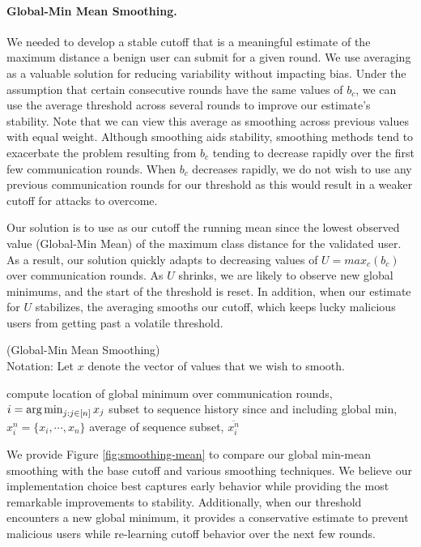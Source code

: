 \documentclass{article} %
\begin{document}
%
\paragraph{Global-Min Mean Smoothing. } We needed to develop a stable cutoff that is a meaningful estimate of the maximum distance a benign user can submit for a given round. We use averaging as a valuable solution for reducing variability without impacting bias. Under the assumption that certain consecutive rounds have the same values of $b_c$, we can use the average threshold across several rounds to improve our estimate's stability. Note that we can view this average as smoothing across previous values with equal weight. Although smoothing aids stability, smoothing methods tend to exacerbate the problem resulting from $b_c$ tending to decrease rapidly over the first few communication rounds. When $b_c$ decreases rapidly, we do not wish to use any previous communication rounds for our threshold as this would result in a weaker cutoff for attacks to overcome. 

Our solution is to use as our cutoff the running mean since the lowest observed value (Global-Min Mean) of the maximum class distance for the validated user. As a result, our solution quickly adapts to decreasing values of $U = max_c (b_c)$ over communication rounds. As $U$ shrinks, we are likely to observe new global minimums, and the start of the threshold is reset. In addition, when our estimate for $U$ stabilizes, the averaging smooths our cutoff, which keeps lucky malicious users from getting past a volatile threshold. 

\begin{algorithm}[H]
\caption{ (Global-Min Mean Smoothing) \\ 
Notation: Let $x$ denote the vector of values that we wish to smooth.
}
\label{alg:smoothing}
\begin{algorithmic}[1]

        \State compute location of global minimum over communication rounds, $i = \operatorname*{arg\,min}_{j: j \in \mathopen[ n \mathclose]} x_j$
        \State subset to sequence history since and including global min, $x_i^n = \{x_i, \cdots, x_n \}$
        \State \Return average of sequence subset, $\overline{x_i^n}$
    \EndProcedure
\end{algorithmic}
\end{algorithm}

We provide Figure \ref{fig:smoothing-mean} to compare our global min-mean smoothing with the base cutoff and various smoothing techniques. We believe our implementation choice best captures early behavior while providing the most remarkable improvements to stability. Additionally, when our threshold encounters a new global minimum, it provides a conservative estimate to prevent malicious users while re-learning cutoff behavior over the next few rounds.
\end{document}
